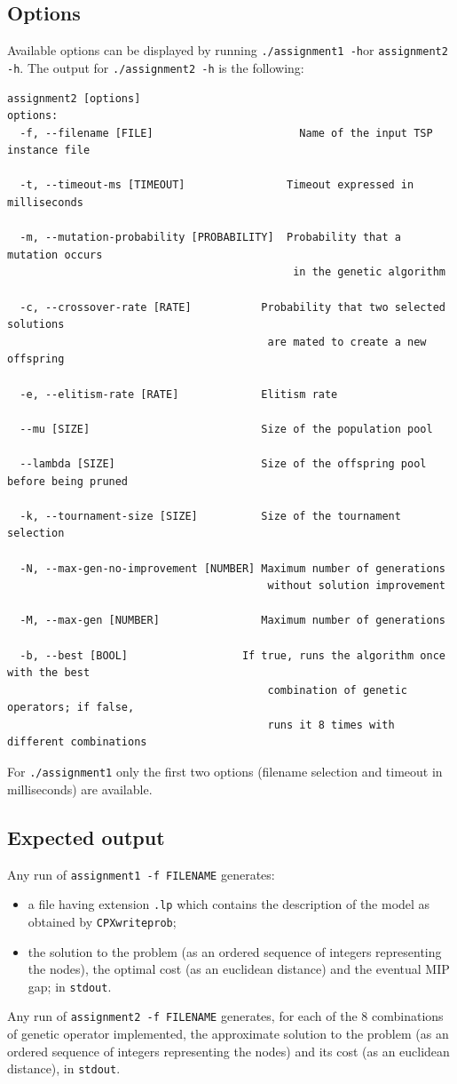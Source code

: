\documentclass[../main.tex]{subfiles}
\begin{document}
\subsection{Options}
Available options can be displayed by running \texttt{./assignment1 -h}or \texttt{assignment2 -h}. The output for \texttt{./assignment2 -h} is the following:
\begin{verbatim}
assignment2 [options]
options:
  -f, --filename [FILE]                  	  Name of the input TSP instance file
  
  -t, --timeout-ms [TIMEOUT]                Timeout expressed in milliseconds

  -m, --mutation-probability [PROBABILITY]  Probability that a mutation occurs 
                                             in the genetic algorithm

  -c, --crossover-rate [RATE]           Probability that two selected solutions 
                                         are mated to create a new offspring

  -e, --elitism-rate [RATE]             Elitism rate

  --mu [SIZE]                           Size of the population pool

  --lambda [SIZE]                       Size of the offspring pool before being pruned

  -k, --tournament-size [SIZE]          Size of the tournament selection

  -N, --max-gen-no-improvement [NUMBER] Maximum number of generations 
                                         without solution improvement

  -M, --max-gen [NUMBER]                Maximum number of generations
  
  -b, --best [BOOL]                  If true, runs the algorithm once with the best 	
                                         combination of genetic operators; if false, 
                                         runs it 8 times with different combinations
\end{verbatim}

For \texttt{./assignment1} only the first two options (filename selection and timeout in milliseconds) are available.

\subsection{Expected output}
Any run of \texttt{assignment1 -f FILENAME} generates: 
\begin{itemize}
\item a file having extension \texttt{.lp} which contains the description of the model as obtained by \texttt{CPXwriteprob};

\item the solution to the problem (as an ordered sequence of integers representing the nodes), the optimal cost (as an euclidean distance) and the eventual MIP gap; in \texttt{stdout}.
\end{itemize}

Any run of \texttt{assignment2 -f FILENAME} generates, for each of the 8 combinations
of genetic operator implemented, the approximate solution to the problem (as an ordered sequence of integers representing the nodes) and its cost (as an euclidean distance), in \texttt{stdout}.
\end{document}
